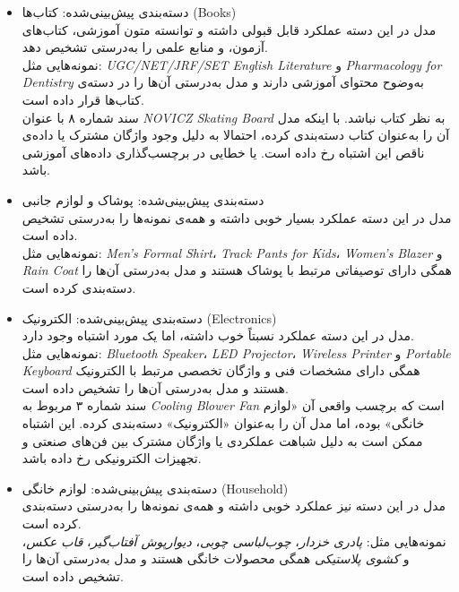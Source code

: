 \documentclass[a4paper,12pt]{article}
\begin{document}
\begin{itemize}
  \item دسته‌بندی پیش‌بینی‌شده: کتاب‌ها (Books)\\
مدل در این دسته عملکرد قابل قبولی داشته و توانسته متون آموزشی، کتاب‌های آزمون، و منابع علمی را به‌درستی تشخیص دهد.
\\
نمونه‌هایی مثل: \textit{UGC/NET/JRF/SET English Literature} و \textit{Pharmacology for Dentistry} به‌وضوح محتوای آموزشی دارند و مدل به‌درستی آن‌ها را در دسته‌ی کتاب‌ها قرار داده است.
\\
سند شماره ۸ با عنوان \textit{NOVICZ Skating Board} به نظر کتاب نباشد. با اینکه مدل آن را به‌عنوان کتاب دسته‌بندی کرده، احتمالا به دلیل وجود واژگان مشترک یا داده‌ی ناقص این اشتباه رخ داده است. یا خطایی در برچسب‌گذاری داده‌های آموزشی باشد.
\\

  \item دسته‌بندی پیش‌بینی‌شده: پوشاک و لوازم جانبی \\
مدل در این دسته عملکرد بسیار خوبی داشته و همه‌ی نمونه‌ها را به‌درستی تشخیص داده است.
\\
نمونه‌هایی مثل: \textit{Men's Formal Shirt}، \textit{Track Pants for Kids}، \textit{Women's Blazer} و \textit{Rain Coat} همگی دارای توصیفاتی مرتبط با پوشاک هستند و مدل به‌درستی آن‌ها را دسته‌بندی کرده است.
\\

  \item دسته‌بندی پیش‌بینی‌شده: الکترونیک (Electronics)\\
مدل در این دسته عملکرد نسبتاً خوب داشته، اما یک مورد اشتباه وجود دارد.
\\
نمونه‌هایی مثل: \textit{Bluetooth Speaker}، \textit{LED Projector}، \textit{Wireless Printer} و \textit{Portable Keyboard} همگی دارای مشخصات فنی و واژگان تخصصی مرتبط با الکترونیک هستند و مدل به‌درستی آن‌ها را تشخیص داده است.
\\
سند شماره ۳ مربوط به \textit{Cooling Blower Fan} است که برچسب واقعی آن «لوازم خانگی» بوده، اما مدل آن را به‌عنوان «الکترونیک» دسته‌بندی کرده. این اشتباه ممکن است به دلیل شباهت عملکردی یا واژگان مشترک بین فن‌های صنعتی و تجهیزات الکترونیکی رخ داده باشد.
\\

  \item دسته‌بندی پیش‌بینی‌شده: لوازم خانگی (Household)\\
مدل در این دسته نیز عملکرد خوبی داشته و همه‌ی نمونه‌ها را به‌درستی دسته‌بندی کرده است.
\\
نمونه‌هایی مثل: \textit{پادری خزدار}، \textit{چوب‌لباسی چوبی}، \textit{دیوارپوش آفتاب‌گیر}، \textit{قاب عکس}، و \textit{کشوی پلاستیکی} همگی محصولات خانگی هستند و مدل به‌درستی آن‌ها را تشخیص داده است.
\\
\end{itemize}
\end{document}
